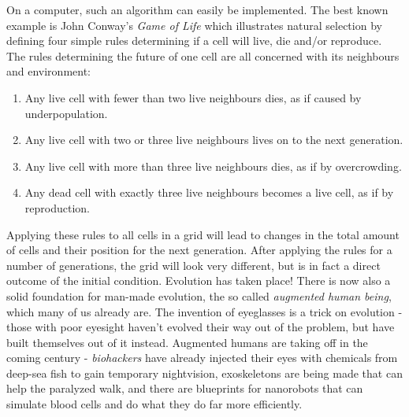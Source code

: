 On a computer, such an algorithm can easily be implemented.
The best known example is John Conway's \emph{Game of Life} \cite{Conway} which illustrates natural selection by defining four simple rules determining if a cell will live, die and/or reproduce.
The rules determining the future of one cell are all concerned with its neighbours and environment:
\begin{enumerate}
\item Any live cell with fewer than two live neighbours dies, as if caused by underpopulation.
\item Any live cell with two or three live neighbours lives on to the next generation.
\item Any live cell with more than three live neighbours dies, as if by overcrowding.
\item Any dead cell with exactly three live neighbours becomes a live cell, as if by reproduction.
\end{enumerate}
Applying these rules to all cells in a grid will lead to changes in the total amount of cells and their position for the next generation.
After applying the rules for a number of generations, the grid will look very different, but is in fact a direct outcome of the initial condition.
Evolution has taken place! 
There is now also a solid foundation for man-made evolution, the so called \emph{augmented human being}, which many of us already are.
The invention of eyeglasses is a trick on evolution - those with poor eyesight haven't evolved their way out of the problem, but have built themselves out of it instead.
Augmented humans are taking off in the coming century - \emph{biohackers} have already injected their eyes with chemicals from deep-sea fish to gain temporary nightvision\cite{biohack}, exoskeletons are being made that can help the paralyzed walk, and there are blueprints for nanorobots that can simulate blood cells and do what they do far more efficiently\cite{nanoblood}. 

